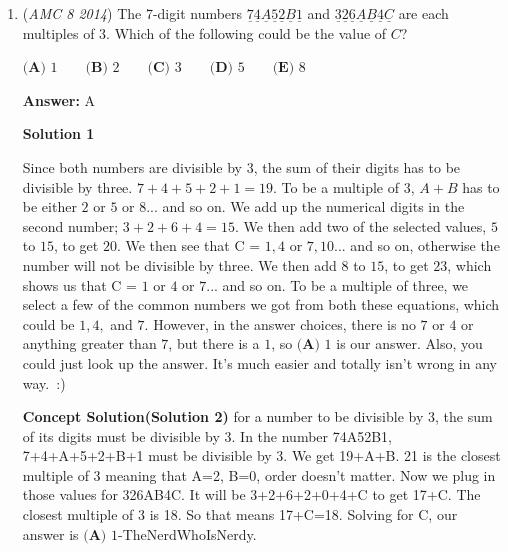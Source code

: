 \begin{enumerate}
 $1^2\pi$ is equal to 1. It is obvious that they are all quarter-circles, as mentioned in solution 1, so you divide each of 

 them by $4$. So they become $\pi$, $\frac{9}{4}\pi$, and $\frac{1}{4}\pi$. Adding them together, it's $\frac{14}{4}\pi$. 

 Now you can calculate $15-\frac{14}{4}\pi$, and you'll get around $4.00000000000001$, which is closest to $\boxed{\text{(B) }4.0}$



	\item (\textit{AMC 8 2014}) The 7-digit numbers $\underline{7} \underline{4} \underline{A} \underline{5} \underline{2} \underline{B} \underline{1}$ and $\underline{3} \underline{2} \underline{6} \underline{A} \underline{B} \underline{4} \underline{C}$ are each multiples of 3. Which of the following could be the value of $C$?


 $\textbf{(A) }1\qquad\textbf{(B) }2\qquad\textbf{(C) }3\qquad\textbf{(D) }5\qquad\textbf{(E) }8$

 \textbf{Answer: }A



\textbf{Solution 1}

Since both numbers are divisible by 3, the sum of their digits has to be divisible by three. $7 + 4 + 5 + 2 + 1 = 19$. To be a multiple of $3$, $A + B$ has to be either $2$ or $5$ or $8$... and so on. We add up the numerical digits in the second number; $3 + 2 + 6 + 4 = 15$. We then add two of the selected values, $5$ to $15$, to get $20$. We then see that C = $1, 4$ or $7, 10$... and so on, otherwise the number will not be divisible by three. We then add $8$ to $15$, to get $23$, which shows us that C = $1$ or $4$ or $7$... and so on. To be a multiple of three, we select a few of the common numbers we got from both these equations, which could be $1, 4,$ and $7$. However, in the answer choices, there is no $7$ or $4$ or anything greater than $7$, but there is a $1$, so  $\boxed{\textbf{(A) }1}$ is our answer. Also, you could just look up the answer. It’s much easier and totally isn’t wrong in any way. :)

 \textbf{Concept Solution(Solution 2)} for a number to be divisible by 3, the sum of its digits must be divisible by 3. In the number 74A52B1, 7+4+A+5+2+B+1 must be divisible by 3. We get 19+A+B. 21 is the closest multiple of 3 meaning that A=2, B=0, order doesn't matter. Now we plug in those values for 326AB4C. It will be 3+2+6+2+0+4+C to get 17+C. The closest multiple of 3 is 18. So that means 17+C=18. Solving for C, our answer is $\boxed{\textbf{(A) }1}$-TheNerdWhoIsNerdy.


\end{enumerate}

